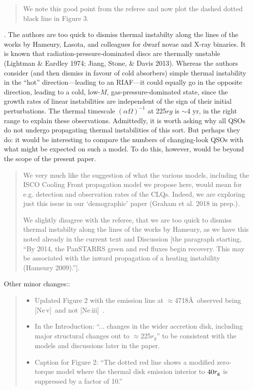 \documentclass[11pt, a4paper]{article}
\begin{document}
\begin{quote}
We note this good point from the referee and now plot the dashed
dotted black line in Figure 3. 
\end{quote}


. The authors are too quick to dismiss thermal instabilty along the
lines of the works by Hameury, Lasota, and colleagues for dwarf novae
and X-ray binaries. It is known that radiation-pressure-dominated
discs are thermally unstable (Lightman \& Eardley 1974; Jiang, Stone,
\& Davis 2013). Whereas the authors consider (and then dismiss in
favour of cold absorbers) simple thermal instability in the “hot”
direction—leading to an RIAF—it could equally go in the opposite
direction, leading to a cold, low-$\dot{M}$, gas-pressure-dominated state,
since the growth rates of linear instabilities are independent of the
sign of their initial perturbations. The thermal timescale
$(\alpha\Omega)^{-1}$ at 225$rg$ is $\sim$4 yr, in the right range to
explain these observations. Admittedly, it is worth asking why all
QSOs do not undergo propagating thermal instabilities of this
sort. But perhaps they do: it would be interesting to compare the
numbers of changing-look QSOs with what might be expected on such a
model. To do this, however, would be beyond the scope of the present
paper.

\begin{quote}
We very much like the suggestion of what the various models, including
the ISCO Cooling Front propagation model we propose here, would mean
for e.g. detection and observation rates of the CLQs. Indeed, we are
exploring just this issue in our `demographic' paper (Graham et
al. 2018 in prep.).

We slightly disagree with the referee, that we are too quick to
dismiss thermal instabilty along the lines of the works by Hameury, as
we have this noted already in the current text and Discussion [the
paragraph starting, ``By 2014, the PanSTARRS green and red fluxes
begin recovery. This may be associated with the inward propagation of
a heating instability (Hameury 2009).''].
\end{quote}

\noindent
Other minor changes::

\begin{quote}
  \begin{itemize}
  \item Updated Figure 2 with the emission line at $\approx$4718\AA\ observed being [Ne\,{\sc v}]\ and not [Ne\,{\sc iii}]\ .
  \item In the Introduction: ``... changes in the wider accretion disk, including major structural changes out to $\approx$225$r_{g}$'' to be consistent with the models and discussions later in the paper. 
  \item Caption for Figure 2: ``The dotted red line shows a modified zero-torque model where the thermal disk emission interior to $40 r_{\rm g}$ is suppressed by a factor of 10.''
  \end{itemize}
\end{quote}
\end{document}
